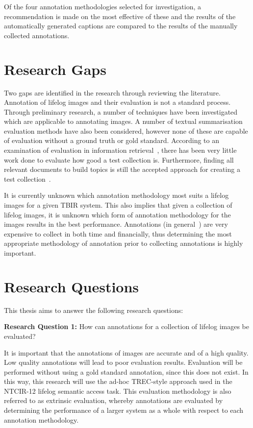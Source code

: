 Of the four annotation methodologies selected for investigation, a recommendation is made on the most effective of these and the results of the automatically generated captions are compared to the results of the manually collected annotations. 

\section{Research Gaps}

Two gaps are identified in the research through reviewing the literature. Annotation of lifelog images and their evaluation is not a standard process. Through preliminary research, a number of techniques have been investigated which are applicable to annotating images. A number of textual summarisation evaluation methods have also been considered, however none of these are capable of evaluation without a ground truth or gold standard. According to an examination of evaluation in information retrieval~\cite[p. 24]{sanderson2010test}, there has been very little work done to evaluate how good a test collection is. Furthermore, finding all relevant documents to build topics is still the accepted approach for creating a test collection~\cite{cooper1973selecting}.

It is currently unknown which annotation methodology most suits a lifelog images for a given TBIR system. This also implies that given a collection of lifelog images, it is unknown which form of annotation methodology for the images results in the best performance. Annotations (in general~\cite{snow2008cheap}) are very expensive to collect in both time and financially, thus determining the most appropriate methodology of annotation prior to collecting annotations is highly important.

\section{Research Questions}

This thesis aims to answer the following research questions:

\textbf{Research Question 1:} How can annotations for a collection of lifelog images be evaluated?

It is important that the annotations of images are accurate and of a high quality. Low quality annotations will lead to poor evaluation results. Evaluation will be performed without using a gold standard annotation, since this does not exist. In this way, this research will use the ad-hoc TREC-style approach used in the NTCIR-12 lifelog semantic access task. This evaluation methodology is also referred to as extrinsic evaluation, whereby annotations are evaluated by determining the performance of a larger system as a whole with respect to each annotation methodology.

